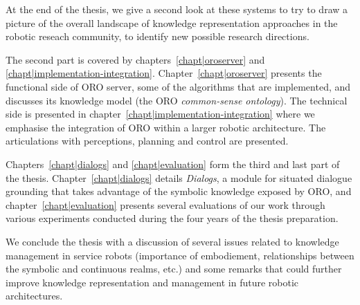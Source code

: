 At the end of the thesis, we give a second look at these systems to try to
draw a picture of the overall landscape of knowledge representation approaches
in the robotic reseach community, to identify new possible research directions.

The second part is covered by chapters~\ref{chapt|oroserver} and
\ref{chapt|implementation-integration}. Chapter~\ref{chapt|oroserver} presents
the functional side of ORO server, some of the algorithms that are
implemented, and discusses its knowledge model (the ORO \emph{common-sense
ontology}). The technical side is presented in
chapter~\ref{chapt|implementation-integration} where we emphasise the
integration of ORO within a larger robotic architecture. The articulations with
perceptions, planning and control are presented.

Chapters~\ref{chapt|dialogs} and \ref{chapt|evaluation} form the third and last
part of the thesis. Chapter~\ref{chapt|dialogs} details \emph{Dialogs}, a
module for situated dialogue grounding that takes advantage of the symbolic
knowledge exposed by ORO, and chapter~\ref{chapt|evaluation} presents
several evaluations of our work through various experiments conducted during
the four years of the thesis preparation.

We conclude the thesis with a discussion of several issues related to knowledge
management in service robots (importance of embodiement, relationships between
the symbolic and continuous realms, etc.) and some remarks that could further
improve knowledge representation and management in future robotic
architectures.

